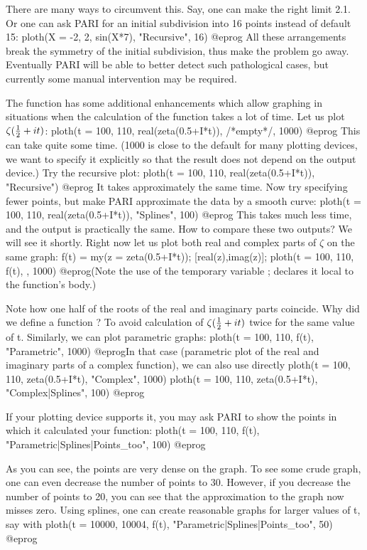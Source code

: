 There are many ways to circumvent this.  Say, one can make the right limit
2.1.  Or one can ask PARI for an initial subdivision into 16 points instead
of default 15:
\bprog
  ploth(X = -2, 2, sin(X*7), "Recursive", 16)
@eprog\noindent
All these arrangements break the symmetry of the initial subdivision, thus
make the problem go away.  Eventually PARI will be able to better detect such
pathological cases, but currently some manual intervention may be required.

The function  has some additional enhancements which allow
graphing in situations when the calculation of the function takes a lot of
time.  Let us plot $\zeta({1\over 2} + it)$:
\bprog
  ploth(t = 100, 110, real(zeta(0.5+I*t)), /*empty*/, 1000)
@eprog\noindent
This can take quite some time.  (1000 is close to the default for many
plotting devices, we want to specify it explicitly so that the result does
not depend on the output device.)  Try the recursive plot:
\bprog
  ploth(t = 100, 110, real(zeta(0.5+I*t)), "Recursive")
@eprog\noindent
It takes approximately the same time.  Now try specifying fewer points,
but make PARI approximate the data by a smooth curve:
\bprog
  ploth(t = 100, 110, real(zeta(0.5+I*t)), "Splines", 100)
@eprog\noindent
This takes much less time, and the output is practically the same.  How to
compare these two outputs?  We will see it shortly.  Right now let us plot
both real and complex parts of $\zeta$ on the same graph:
\bprog
  f(t) = my(z = zeta(0.5+I*t)); [real(z),imag(z)];
  ploth(t = 100, 110, f(t), , 1000)
@eprog\noindent (Note the use of the temporary variable ; 
declares it local to the function's body.)

Note how one half of the roots of the real and imaginary parts coincide.
Why did we define a function ?  To avoid calculation of
$\zeta({1\over2} + it)$ twice for the same value of t.  Similarly, we can
plot parametric graphs:
\bprog
  ploth(t = 100, 110, f(t), "Parametric", 1000)
@eprog\noindent In that case (parametric plot of the real and imaginary parts
of a complex function), we can also use directly
\bprog
  ploth(t = 100, 110, zeta(0.5+I*t), "Complex", 1000)
  ploth(t = 100, 110, zeta(0.5+I*t), "Complex|Splines", 100)
@eprog

If your plotting device supports it, you may ask PARI to show the points
in which it calculated your function:
\bprog
  ploth(t = 100, 110, f(t), "Parametric|Splines|Points_too", 100)
@eprog

As you can see, the points are very dense on the graph.  To see some crude
graph, one can even decrease the number of points to 30.  However, if you
decrease the number of points to 20, you can see that the approximation to
the graph now misses zero.  Using splines, one can create reasonable graphs
for larger values of t, say with
\bprog
  ploth(t = 10000, 10004, f(t), "Parametric|Splines|Points_too", 50)
@eprog


